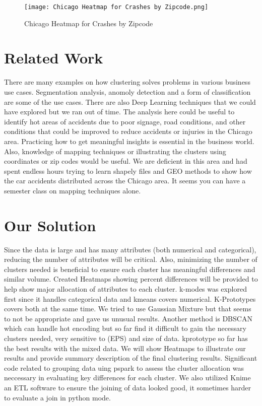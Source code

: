 \documentclass[conference]{IEEEtran}
\begin{document}
\begin{figure}[!h]
	\texttt{[image: Chicago Heatmap for Crashes by Zipcode.png]}
	\caption{Chicago Heatmap for Crashes by Zipcode}
	\label{fig: Chicago Heatmap for Crashes by Zipcode}
 \end{figure}

\section{Related Work}
There are many examples on how clustering solves problems in various business use cases.  Segmentation analysis, anomoly detection and a form of classification are some of the use cases. There are also Deep Learning techniques that we could have explored but we ran out of time.  The analysis here could be useful to identify hot areas of accidents due to poor signage, road conditions, and other conditions that could be improved to reduce accidents or injuries in the Chicago area.  Practicing how to get meaningful insights is essential in the business world.  Also, knowledge of mapping techniques or illustrating the clusters using coordinates or zip codes would be useful.  We are deficient in this area and had spent endless hours trying to learn shapely files and GEO methods to show how the car accidents distributed across the Chicago area.  It seems you can have a semester class on mapping techniques alone.


\section{Our Solution}
Since the data is large and has many attributes (both numerical and categorical), reducing the number of attributes will be critical.  Also, minimizing the number of clusters needed is beneficial to ensure each cluster has meaningful differences and similar volume. Created Heatmaps showing percent differences will be provided to help show major allocation of attributes to each cluster. k-modes was explored first since it handles categorical data and kmeans covers numerical.  K-Prototypes covers both at the same time.  We tried to use Gaussian Mixture but that seems to not be appropriate and gave us unusual results.  Another method is DBSCAN which can handle hot encoding but so far find it difficult to gain the necessary clusters needed, very sensitive to (EPS) and size of data.  kprototype so far has the best results with the mixed data.  We will show Heatmaps to illustrate our results and provide summary description of the final clustering results.  Significant code related to grouping data uing pspark to assess the cluster allocation was neccessary in evaluating key differences for each cluster.  We also utilized Knime an ETL software to ensure the joining of data looked good,  it sometimes harder to evaluate a join in python mode.
\end{document}
